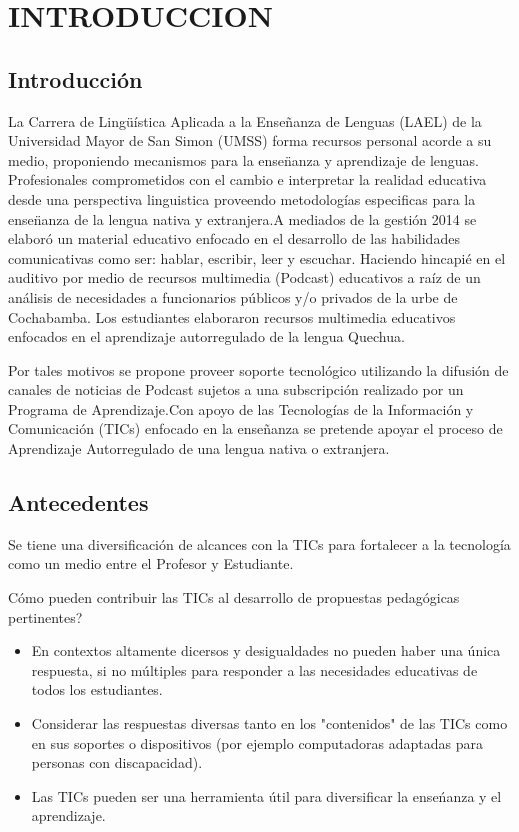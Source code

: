 \chapter{INTRODUCCION}

\section{Introducción}

La Carrera de Ling\"{u}ística Aplicada a la Enseñanza de Lenguas (LAEL) de la Universidad Mayor de San Simon (UMSS)
forma recursos  personal acorde a su medio, proponiendo mecanismos para la ense\"{n}anza y aprendizaje de lenguas.
Profesionales comprometidos con el cambio e interpretar la realidad educativa desde una perspectiva linguistica  proveendo
metodolog\'{i}as especificas para la ense\"{n}anza de la lengua nativa y extranjera.A mediados de la gestión 2014 se elaboró
un material educativo enfocado en el desarrollo de las habilidades comunicativas como ser: hablar, escribir, leer y escuchar. 
Haciendo hincapié en el auditivo por medio de recursos multimedia (Podcast) educativos a raíz de un análisis de necesidades a 
funcionarios públicos y/o privados de la urbe de Cochabamba. Los estudiantes elaboraron recursos multimedia educativos enfocados 
en el aprendizaje autorregulado de la lengua Quechua.

Por tales motivos se propone proveer soporte tecnológico utilizando la difusión de canales de noticias de Podcast sujetos a una 
subscripci\'{o}n realizado por un Programa de Aprendizaje.Con apoyo de las Tecnologías de la Información y Comunicación (TICs) 
enfocado en la enseñanza se pretende apoyar el proceso de Aprendizaje Autorregulado de una lengua nativa o extranjera.

\section{Antecedentes}

Se tiene una diversificaci\'{o}n de alcances con la TICs para fortalecer a la tecnolog\'{i}a como un medio entre
el Profesor y Estudiante.

\textquestiondown C\'{o}mo pueden contribuir las TICs al desarrollo de propuestas pedag\'{o}gicas pertinentes?
\begin{itemize}
\item En contextos altamente dicersos y desigualdades no pueden haber una \'{u}nica respuesta,
si no m\'{u}ltiples para responder a las necesidades educativas de todos los estudiantes.
\item Considerar las respuestas diversas tanto en los "contenidos" de las TICs como en sus soportes o dispositivos (por ejemplo computadoras adaptadas para personas con discapacidad).
\item Las TICs pueden ser una herramienta \'{u}til para diversificar la ense\'{n}anza y el aprendizaje.\cite{severin2013enfoques}
\end{itemize}

